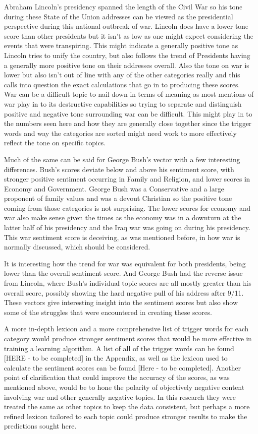 Abraham Lincoln's presidency spanned the length of the Civil War so his tone during these State of the Union addresses can be viewed as the presidential perspective during this national outbreak of war.
Lincoln does have a lower tone score than other presidents but it isn't as low as one might expect considering the events that were transpiring.
This might indicate a generally positive tone as Lincoln tries to unify the country, but also follows the trend of Presidents having a generally more positive tone on their addresses overall.
Also the tone on war is lower but also isn't out of line with any of the other categories really and this calls into question the exact calculations that go in to producing these scores.
War can be a difficult topic to nail down in terms of meaning as most mentions of war play in to its destructive capabilities so trying to separate and distinguish positive and negative tone surrounding war can be difficult.
This might play in to the numbers seen here and how they are generally close together since the trigger words and way the categories are sorted might need work to more effectively reflect the tone on specific topics.

Much of the same can be said for George Bush's vector with a few interesting differences.
Bush's scores deviate below and above his sentiment score, with stronger positive sentiment occurring in Family and Religion, and lower scores in Economy and Government.
George Bush was a Conservative and a large proponent of family values and was a devout Christian so the positive tone coming from those categories is not surprising.
The lower scores for economy and war also make sense given the times as the economy was in a downturn at the latter half of his presidency and the Iraq war was going on during his presidency.
This war sentiment score is deceiving, as was mentioned before, in how war is normally discussed, which should be considered.

It is interesting how the trend for war was equivalent for both presidents, being lower than the overall sentiment score.
And George Bush had the reverse issue from Lincoln, where Bush's individual topic scores are all mostly greater than his overall score, possibly showing the hard negative pull of his address after 9/11.
These vectors give interesting insight into the sentiment scores but also show some of the struggles that were encountered in creating these scores.

A more in-depth lexicon and a more comprehensive list of trigger words for each category would produce stronger sentiment scores that would be more effective in training a learning algorithm.
A list of all of the trigger words can be found [HERE - to be completed] in the Appendix, as well as the lexicon used to calculate the sentiment scores can be found [Here - to be completed].
Another point of clarification that could improve the accuracy of the scores, as was mentioned above, would be to hone the polarity of objectively negative content involving war and other generally negative topics.
In this research they were treated the same as other topics to keep the data consistent, but perhaps a more refined lexicon tailored to each topic could produce stronger results to make the predictions sought here.

